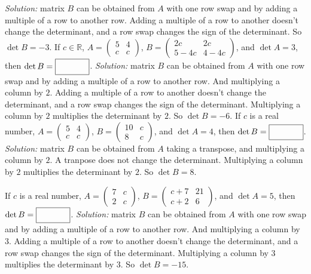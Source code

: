 \begin{parts}
        \ifnum {} {\color{DarkBlue} \textit{Solution:} matrix $B$ can be obtained from $A$ with one row swap and by adding a multiple of a row to another row. Adding a multiple of a row to another doesn't change the determinant, and a row swap changes the sign of the determinant. So $\det B = -3$. } \fi  
    \fi 
    \ifnum {}
      If  $c \in \mathbb R$,  $A = \begin{pmatrix} 5&4\\c&c\end{pmatrix}$, $ B = \begin{pmatrix}2c&2c\\5-4c&4-4c \end{pmatrix}$, and $ \det A = 3$, then $\det B =  \framebox{\strut\hspace{1.2cm}}$.
        \ifnum {} {\color{DarkBlue} \textit{Solution:} matrix $B$ can be obtained from $A$ with one row swap and by adding a multiple of a row to another row. And multiplying a column by $2$.  Adding a multiple of a row to another doesn't change the determinant, and a row swap changes the sign of the determinant. Multiplying a column by $2$ multiplies the determinant by $2$. So $\det B = -6$. }
        \fi
    \fi    
    \ifnum {}
              If  $c$ is a  real number,  $A = \begin{pmatrix} 5&4\\c&c\end{pmatrix}$, $ B = \begin{pmatrix}10& c\\8 & c  \end{pmatrix}$, and $ \det A = 4$, then $\det B =  \framebox{\strut\hspace{1.2cm}}$.
        \ifnum {} {\color{DarkBlue} \textit{Solution:} matrix $B$ can be obtained from $A$ taking a transpose,  and multiplying a column by $2$. A tranpose does not change the determinant.  Multiplying a column by $2$ multiplies the determinant by $2$. So $\det B = 8$. }
        
         \fi
    \fi    
    \ifnum {}
              If  $c$ is a  real number,  $A = \begin{pmatrix} 7&c \\2&c\end{pmatrix}$, $ B = \begin{pmatrix}  c+7 &21 \\c+2&6 \end{pmatrix}$, and $ \det A = 5$, then $\det B =  \framebox{\strut\hspace{1.2cm}}$.
        \ifnum {} {\color{DarkBlue} \textit{Solution:} matrix $B$ can be obtained from $A$ with one row swap and by adding a multiple of a row to another row. And multiplying a column by $3$.  Adding a multiple of a row to another doesn't change the determinant, and a row swap changes the sign of the determinant. Multiplying a column by $3$ multiplies the determinant by $3$. So $\det B = -15$. }
             \fi
    \fi          








\end{parts}
